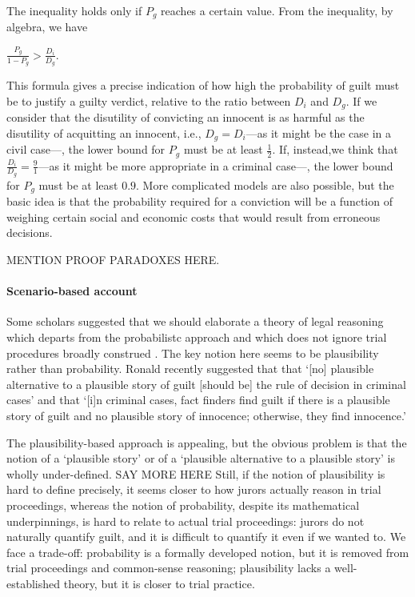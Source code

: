 \documentclass[10pt]{article}
\begin{document}
The inequality holds only if $P_g$ reaches a certain value. 
From the inequality, by algebra, we have

\vspace{2mm}
$\frac{P_g}{1- P_g} > \frac{D_i}{D_g}$.

\vspace{2mm}
\noindent
This formula gives a precise indication of how high the probability 
of guilt must be to justify a guilty verdict, relative to the ratio between $D_i$ and $D_g$. If we consider that
the disutility of convicting an innocent is as harmful as the disutility of acquitting an innocent, 
i.e., $D_g=D_i$---as it might be the case in a civil case---, the lower bound for $P_g$ must be at least $\frac{1} {2}$. 
If, instead,we think that $\frac{D_i}{D_g}=\frac{9}{1}$---as it might be more appropriate in a criminal 
case---, the lower bound for $P_g$ must be at least $0.9$. More complicated models are also possible, 
but the basic idea is that the probability required for a conviction will be a function of weighing certain social and 
economic costs that would result from erroneous decisions. 

MENTION PROOF PARADOXES HERE. 

\paragraph{Scenario-based account}


Some scholars suggested that we should elaborate a 
theory of legal reasoning which departs from the 
probabilistc approach and which does not ignore trial procedures broadly construed
\citep{cohen77, nesson79, Thomson86, Walton2002, Stein05, Pardo2008Judicial-Proof-, ho08, Haack2011Legal-Probabili}.
The key notion here seems to be plausibility rather than probability.
Ronald \cite{Allen2010No-Plausible-Al} recently suggested that that 
`[no] plausible alternative to a plausible story of guilt [should be] the rule of decision in criminal cases'
and that `[i]n criminal cases, fact finders find guilt if there is a plausible story of guilt and 
no plausible story of innocence; otherwise, they find innocence.'

The plausibility-based approach is appealing, but the obvious problem is that the notion of a `plausible story' or of a `plausible alternative to a plausible story' is wholly under-defined. 
SAY MORE HERE
Still, if the notion of plausibility is hard to define precisely, it seems closer to how jurors actually reason in trial proceedings, whereas the notion of probability, despite its 
mathematical underpinnings, is hard to relate to actual trial proceedings: jurors do not naturally quantify guilt, and it is difficult to quantify it 
even if we wanted to. We face a trade-off: probability is a formally developed notion, but it is 
removed from trial proceedings and common-sense reasoning; plausibility 
lacks a well-established theory, but it is closer to trial practice. 
\end{document}
